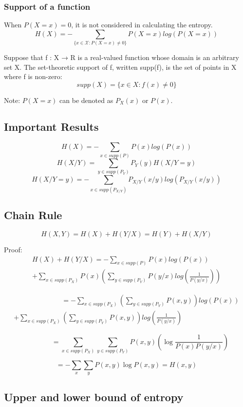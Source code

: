 \documentclass{article}
\begin{document}
\subsubsection{Support of a function}

When $P(X=x)=0$, it is not considered in calculating the entropy.
$$ H(X)=-\sum_{ \{ x \in \mathcal{X} : P(X=x) \neq 0\} } P(X=x)log(P(X=x))$$

Suppose that f : X → R is a real-valued function whose domain is an arbitrary set X. The set-theoretic support of f, written supp(f), is the set of points in X where f is non-zero:
$$ supp(X)=\{ x \in X : f(x) \neq 0 \}$$

Note: $P(X=x)$ can be denoted as $P_X(x)$ or $P(x)$.
\subsection{Important Results}
     $$ H(X)= -\sum_{x \in supp(P)} P(x)log(P(x))$$
     $$ H(X/Y)= \sum_{y \in supp(P_Y)} P_Y(y)H(X/Y=y)$$
     $$ H(X/Y=y)= -\sum_{x \in supp(P_{X/Y})} P_{X/Y}(x/y)log(P_{X/Y}(x/y))$$

\subsection{Chain Rule}
$$ H(X,Y)=H(X)+H(Y/X)=H(Y)+H(X/Y)$$

Proof:
\begin{multline*}
     H(X)+H(Y/X)= -\sum_{x \in supp(P)} P(x)log(P(x)) \\
      + \sum_{x \in supp(P_X)} P(x)\left(\sum_{y \in supp(P_{Y})} P(y/x)log\left(\frac{1}{P(y/x)}\right)\right)
\end{multline*}

\begin{multline*}
    \qquad \qquad \qquad \quad= -\sum_{x \in supp(P_X)}\left(\sum_{y \in supp(P_Y)} P(x,y)\right)log(P(x)) \\
    + \sum_{x \in supp(P_X)} \left(\sum_{y \in supp(P_{Y})} P(x,y) \right) log\left(\frac{1}{P(y/x)}\right)
\end{multline*}


$$ \qquad \qquad =\sum_{x \in supp(P_X)} \sum_{y \in supp(P_{Y})} P(x,y)\left(\log \frac{1}{P(x)P(y/x)} \right)  $$

$$ = - \sum_x \sum_y P(x,y)\log P(x,y)=H(x,y)$$

\subsection{Upper and lower bound of entropy}
\end{document}
